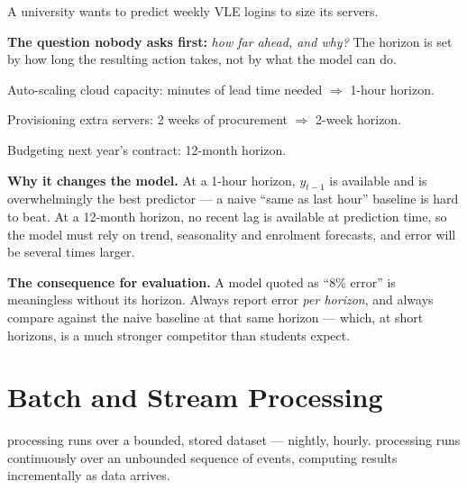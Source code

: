 \begin{worked}
A university wants to predict weekly VLE logins to size its servers.

\smallskip
\textbf{The question nobody asks first:} \emph{how far ahead, and why?} The horizon
is set by how long the resulting action takes, not by what the model can do.
\begin{tight}
  \item Auto-scaling cloud capacity: minutes of lead time needed $\Rightarrow$
        1-hour horizon.
  \item Provisioning extra servers: 2 weeks of procurement $\Rightarrow$ 2-week
        horizon.
  \item Budgeting next year's contract: 12-month horizon.
\end{tight}

\textbf{Why it changes the model.} At a 1-hour horizon, $y_{t-1}$ is available and
is overwhelmingly the best predictor --- a naive ``same as last hour'' baseline is
hard to beat. At a 12-month horizon, no recent lag is available at prediction time,
so the model must rely on trend, seasonality and enrolment forecasts, and error
will be several times larger.

\smallskip
\textbf{The consequence for evaluation.} A model quoted as ``8\% error'' is
meaningless without its horizon. Always report error \emph{per horizon}, and always
compare against the naive baseline at that same horizon --- which, at short
horizons, is a much stronger competitor than students expect.
\end{worked}

\section{Batch and Stream Processing}

\begin{definitionbox}
 processing runs over a bounded, stored dataset --- nightly, hourly.
 processing runs continuously over an unbounded sequence of events,
computing results incrementally as data arrives.
\end{definitionbox}

